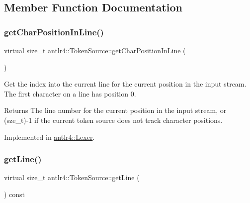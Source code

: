 \subsection{Member Function Documentation}
\mbox{\label{classantlr4_1_1TokenSource_a69822a3dcbce1bd4ca407626a2420e4d}} 
\subsubsection{\texorpdfstring{get\+Char\+Position\+In\+Line()}{getCharPositionInLine()}}
{\footnotesize\ttfamily virtual size\+\_\+t antlr4\+::\+Token\+Source\+::get\+Char\+Position\+In\+Line (\begin{DoxyParamCaption}{ }\end{DoxyParamCaption})\hspace{0.3cm}{\ttfamily [pure virtual]}}



Get the index into the current line for the current position in the input stream. The first character on a line has position 0. 

\begin{DoxyReturn}{Returns}
The line number for the current position in the input stream, or (sze\+\_\+t)-\/1 if the current token source does not track character positions. 
\end{DoxyReturn}


Implemented in \hyperlink{classantlr4_1_1Lexer_a6f2437c9681598c4d9475cb8a91bb2c0}{antlr4\+::\+Lexer}.

\mbox{\label{classantlr4_1_1TokenSource_a3b5d8cfd192fd9b9e4518010e600c714}} 
\subsubsection{\texorpdfstring{get\+Line()}{getLine()}}
{\footnotesize\ttfamily virtual size\+\_\+t antlr4\+::\+Token\+Source\+::get\+Line (\begin{DoxyParamCaption}{ }\end{DoxyParamCaption}) const\hspace{0.3cm}{\ttfamily [pure virtual]}}



